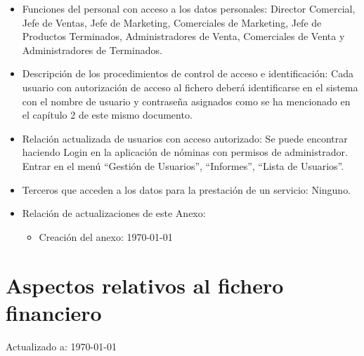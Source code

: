 \documentclass[a4paper,11pt,bibtotoc,noliststotoc]{scrbook}
\begin{document}
\begin{itemize}
\item Funciones del personal con acceso a los datos personales: Director Comercial, Jefe de Ventas, Jefe de Marketing, Comerciales de Marketing, Jefe de Productos Terminados, Administradores de Venta, Comerciales de Venta y Administradores de Terminados.

\item Descripción de los procedimientos de control de acceso e identificación: Cada usuario con autorización de acceso al fichero deberá identificarse en el sistema con el nombre de usuario y contraseña asignados como se ha mencionado en el capítulo 2 de este mismo documento.

\item Relación actualizada de usuarios con acceso autorizado: Se puede encontrar haciendo Login en la aplicación de nóminas con permisos de administrador. Entrar en el menú "`Gestión de Usuarios"', "`Informes"', "`Lista de Usuarios"'.


\item Terceros que acceden a los datos para la prestación de un servicio: Ninguno.


\item Relación de actualizaciones de este Anexo: 

	\begin{itemize}
	\item Creación del anexo: \today
	\end{itemize}

\end{itemize}







\section{Aspectos relativos al fichero financiero}


Actualizado a: \today
\end{document}
